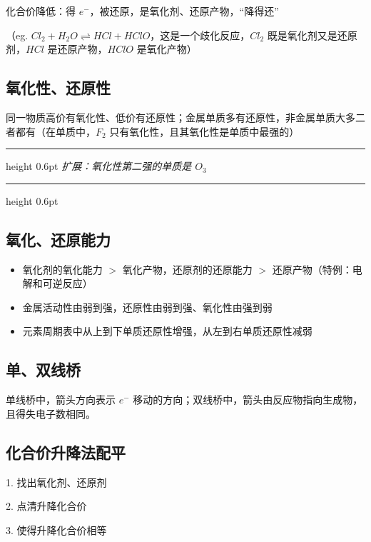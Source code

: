 \documentclass[UTF8,zihao=-4,openany]{ctexbook}
\newenvironment{notebox}
  {\par\smallskip\noindent\begingroup\begin{minipage}{\linewidth}\color{noteframe}\hrule height 0.6pt\smallskip\color{black}\itshape}
  {\par\smallskip\color{noteframe}\hrule height 0.6pt\end{minipage}\endgroup\par\smallskip}
\begin{document}
化合价降低：得 $e^-$，被还原，是氧化剂、还原产物，“降得还”\par

（eg. $Cl_2+H_2O \rightleftharpoons HCl+HClO$，这是一个歧化反应，$Cl_2$ 既是氧化剂又是还原剂，$HCl$ 是还原产物，$HClO$ 是氧化产物）\par
\subsection{氧化性、还原性}
同一物质高价有氧化性、低价有还原性；金属单质多有还原性，非金属单质大多二者都有（在单质中，$F_2$ 只有氧化性，且其氧化性是单质中最强的）\par
\begin{notebox}
扩展：氧化性第二强的单质是 $O_3$\par
\end{notebox}
\subsection{氧化、还原能力}
\begin{itemize}
\item 氧化剂的氧化能力 $>$ 氧化产物，还原剂的还原能力 $>$ 还原产物（特例：电解和可逆反应）
\end{itemize}

\begin{itemize}
\item 金属活动性由弱到强，还原性由弱到强、氧化性由强到弱
\end{itemize}

\begin{itemize}
\item 元素周期表中从上到下单质还原性增强，从左到右单质还原性减弱
\end{itemize}

\subsection{单、双线桥}
单线桥中，箭头方向表示 $e^-$ 移动的方向；双线桥中，箭头由反应物指向生成物，且得失电子数相同。\par
\subsection{化合价升降法配平}
1. 找出氧化剂、还原剂\par

2. 点清升降化合价\par

3. 使得升降化合价相等\par
\end{document}
